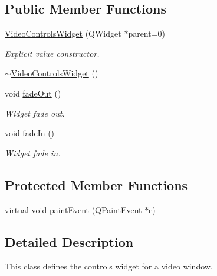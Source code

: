 \subsection*{Public Member Functions}
\begin{DoxyCompactItemize}
\item 
\hyperlink{classVideoControlsWidget_ac0873fb8672cefc5f6549cac23e57757}{Video\-Controls\-Widget} (Q\-Widget $\ast$parent=0)
\begin{DoxyCompactList}\small\item\em Explicit value constructor. \end{DoxyCompactList}\item 
\hyperlink{classVideoControlsWidget_a6b85a92f3e656f11f48cdc580c2b4e0a}{$\sim$\-Video\-Controls\-Widget} ()
\item 
void \hyperlink{classVideoControlsWidget_aa7a0e5cf6d96db502d1826ec9ed43afa}{fade\-Out} ()
\begin{DoxyCompactList}\small\item\em Widget fade out. \end{DoxyCompactList}\item 
void \hyperlink{classVideoControlsWidget_a6fee9a987ad66923a326754e227019cc}{fade\-In} ()
\begin{DoxyCompactList}\small\item\em Widget fade in. \end{DoxyCompactList}\end{DoxyCompactItemize}
\subsection*{Protected Member Functions}
\begin{DoxyCompactItemize}
\item 
virtual void \hyperlink{classVideoControlsWidget_a733c88f42e0cdec6b6209c97cb2391ed}{paint\-Event} (Q\-Paint\-Event $\ast$e)
\end{DoxyCompactItemize}


\subsection{Detailed Description}
This class defines the controls widget for a video window. 

